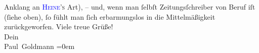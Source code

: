                Anklang an \textsc{\textcolor{blue}{Heine}{}\ledrightnote{\textcolor{blue}{Heinrich Heine}}’s} Art), – und, wenn man ſelbſt
               Zeitungsſchreiber von Beruf iſt (ſiehe oben), ſo fühlt man ſich erbarmungslos in die
               Mittelmäßigkeit zurückgeworfen.\pend
           \pstart
           Viele treue Grüße! {\\[\baselineskip]}Dein {\\[\baselineskip]}\spacefill\mbox{Paul Goldmann}\pend
           \leftskip=0em{}\endnumbering{}  
      